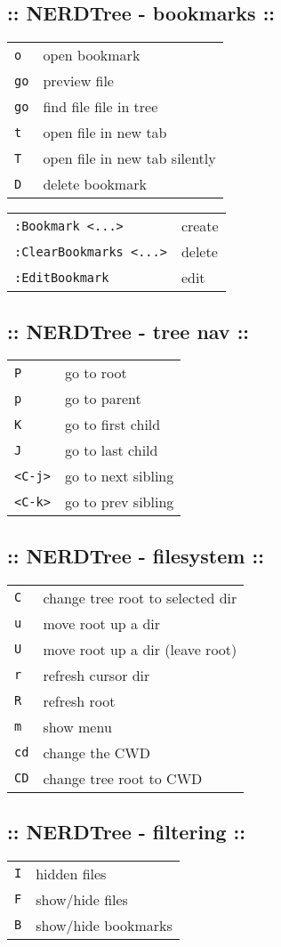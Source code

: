 \subsection{:: NERDTree - bookmarks ::}
\begin{tabular}{@{}ll@{}}
\verb!o!        & open bookmark \\
\verb!go!       & preview file \\
\verb!go!       & find file file in tree \\
\verb!t!        & open file in new tab \\
\verb!T!        & open file in new tab silently \\
\verb!D!        & delete bookmark \\
\end{tabular}
\begin{tabular}{@{}ll@{}}
\verb!:Bookmark <...>!       & create \\
\verb!:ClearBookmarks <...>! & delete \\
\verb!:EditBookmark!         & edit \\
\end{tabular}

\subsection{:: NERDTree - tree nav ::}
\begin{tabular}{@{}ll@{}}
\verb!P!        & go to root \\
\verb!p!        & go to parent \\
\verb!K!        & go to first child \\
\verb!J!        & go to last child \\
\verb!<C-j>!    & go to next sibling \\
\verb!<C-k>!    & go to prev sibling \\
\end{tabular}

\subsection{:: NERDTree - filesystem ::}
\begin{tabular}{@{}ll@{}}
\verb!C!        & change tree root to selected dir \\
\verb!u!        & move root up a dir \\
\verb!U!        & move root up a dir (leave root) \\
\verb!r!        & refresh cursor dir \\
\verb!R!        & refresh root \\
\verb!m!        & show menu \\
\verb!cd!       & change the CWD \\
\verb!CD!       & change tree root to CWD \\
\end{tabular}

\subsection{:: NERDTree - filtering ::}
\begin{tabular}{@{}ll@{}}
    \verb!I!    & hidden files \\
    \verb!F!    & show/hide files \\
    \verb!B!    & show/hide bookmarks \\
\end{tabular}

